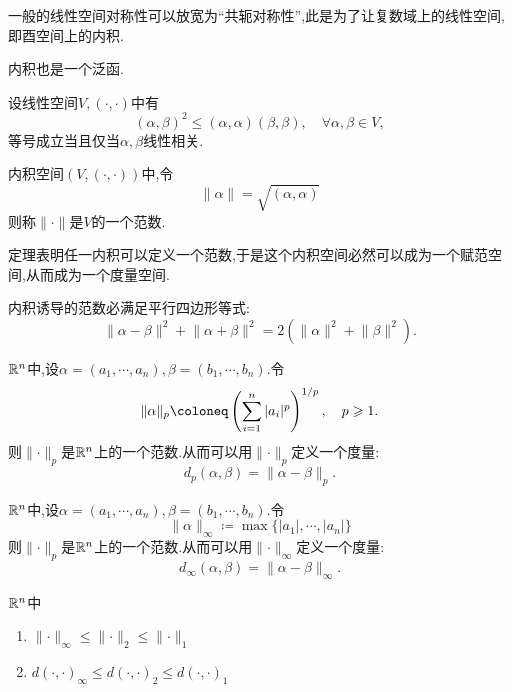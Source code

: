 \begin{remark}
    一般的线性空间对称性可以放宽为“共轭对称性”,此是为了让复数域上的线性空间,即酉空间上的内积.
\end{remark}

\begin{remark}
    内积也是一个泛函.
\end{remark}

\begin{theorem}
    设线性空间$V,(\cdot,\cdot)$中有
    \[(\alpha,\beta)^2\leq (\alpha,\alpha)(\beta,\beta),\quad\forall\alpha,\beta\in V,\]
    等号成立当且仅当$\alpha,\beta$线性相关.
\end{theorem}

\begin{theorem}
    [内积诱导的范数]
    内积空间$(V,(\cdot,\cdot))$中,令
    \[\lVert\alpha\rVert=\sqrt{(\alpha,\alpha)}\]
    则称$\lVert\cdot\rVert$是$V$的一个范数.
\end{theorem}

\begin{remark}
    定理表明任一内积可以定义一个范数,于是这个内积空间必然可以成为一个赋范空间,从而成为一个度量空间.
\end{remark}

\begin{remark}
    内积诱导的范数必满足平行四边形等式:
    \[\lVert\alpha-\beta\rVert^2+\lVert\alpha+\beta\rVert^2=2(\lVert\alpha\rVert^2+\lVert\beta\rVert^2).\]
\end{remark}

\begin{example}
    [$L^p$范数和$L^p$度量]
    $\R^n$中,设$\alpha=(a_1,\cdots,a_n),\beta=(b_1,\cdots,b_n)$.令
    \[\lVert\alpha\rVert_p\coloneq\z(\sum_{i=1}^n|a_i|^p\y)^{1/p},\quad p\geqslant 1.\]
    则$\lVert\cdot\rVert_p$是$\R^n$上的一个范数.从而可以用$\lVert\cdot\rVert_p$定义一个度量:
    \[d_p(\alpha,\beta)=\lVert\alpha-\beta\rVert_p.\]
\end{example}

\begin{example}
    $\R^n$中,设$\alpha=(a_1,\cdots,a_n),\beta=(b_1,\cdots,b_n)$.令
    \[\lVert\alpha\rVert_\infty\coloneq\max\{|a_1|,\cdots,|a_n|\}\]
    则$\lVert\cdot\rVert_p$是$\R^n$上的一个范数.从而可以用$\lVert\cdot\rVert_\infty$定义一个度量:
    \[d_\infty(\alpha,\beta)=\lVert\alpha-\beta\rVert_\infty.\]
\end{example}

\begin{proposition}
    [$\R^n$中范数和度量的常用不等式]
    $\R^n$中
    \begin{enumerate}
        \item $\lVert\cdot\rVert_\infty\leqslant\lVert\cdot\rVert_2\leqslant\lVert\cdot\rVert_1$
        \item $d(\cdot,\cdot)_\infty\leqslant d(\cdot,\cdot)_2\leqslant d(\cdot,\cdot)_1$
    \end{enumerate}
\end{proposition}